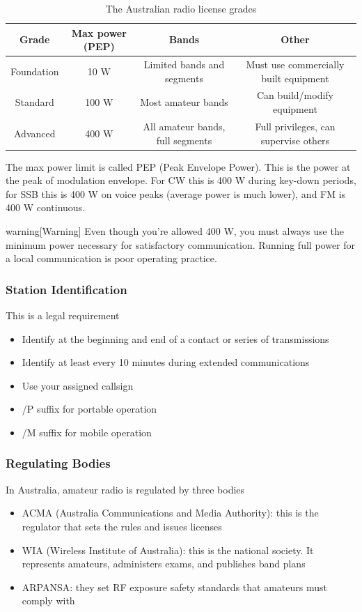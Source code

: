 \documentclass{article}
\begin{document}
\begin{table}[h]
    \centering
    \caption{The Australian radio license grades}
    \label{tab:10}
    \begin{tabular}{c|c|c|c}
        Grade & Max power (PEP) & Bands & Other \\
        \hline
        \hline
        Foundation & 10 W & Limited bands and segments & Must use commercially built equipment \\
        Standard & 100 W & Most amateur bands & Can build/modify equipment \\
        Advanced & 400 W & All amateur bands, full segments & Full privileges, can supervise others \\
    \end{tabular}
\end{table}

The max power limit is called PEP (Peak Envelope Power). This is the power at the peak of modulation envelope. For CW this is 400 W during key-down periods, for SSB this is 400 W on voice peaks (average power is much lower), and FM is 400 W continuous.

\begin{callout}{warning}[Warning]
    Even though you're allowed 400 W, you must always use the minimum power necessary for satisfactory communication. Running full power for a local communication is poor operating practice.
\end{callout}

\subsubsection{Station Identification}
This is a legal requirement
\begin{itemize}
    \item Identify at the beginning and end of a contact or series of transmissions
    \item Identify at least every 10 minutes during extended communications
    \item Use your assigned callsign
    \item /P suffix for portable operation
    \item /M suffix for mobile operation
\end{itemize}

\subsubsection{Regulating Bodies}
In Australia, amateur radio is regulated by three bodies
\begin{itemize}
    \item ACMA (Australia Communications and Media Authority): this is the regulator that sets the rules and issues licenses
    \item WIA (Wireless Institute of Australia): this is the national society. It represents amateurs, administers exams, and publishes band plans
    \item ARPANSA: they set RF exposure safety standards that amateurs must comply with
\end{itemize}
\end{document}
